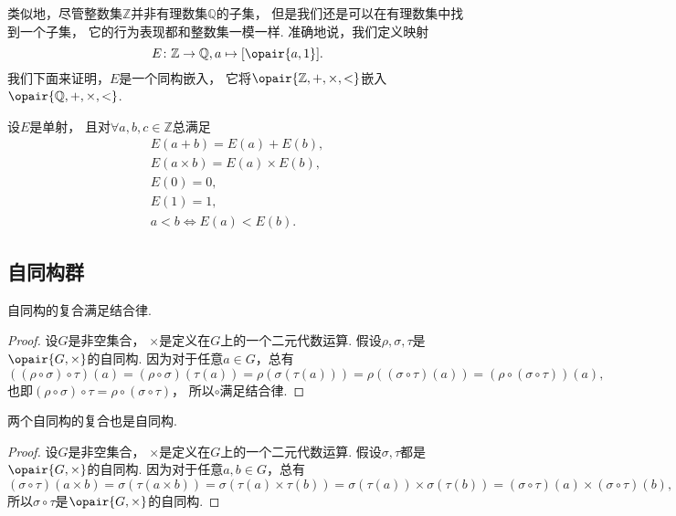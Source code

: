 类似地，尽管整数集\(\mathbb{Z}\)并非有理数集\(\mathbb{Q}\)的子集，
但是我们还是可以在有理数集中找到一个子集，
它的行为表现都和整数集一模一样.
准确地说，我们定义映射\[
	E\colon \mathbb{Z}\to\mathbb{Q}, a\mapsto[\opair{a,1}].
\]
我们下面来证明，\(E\)是一个同构嵌入，
它将\(\opair{\mathbb{Z},+,\times,<}\)嵌入\(\opair{\mathbb{Q},+,\times,<}\).
\begin{theorem}
设\(E\)是单射，
且对\(\forall a,b,c\in\mathbb{Z}\)总满足\begin{gather}
	E(a+b)=E(a)+E(b), \\
	E(a \times b)=E(a) \times E(b), \\
	E(0)=0, \\
	E(1)=1, \\
	a<b \iff E(a)<E(b).
\end{gather}
\end{theorem}

\subsection{自同构群}
\begin{theorem}\label{theorem:抽象代数.自同构的复合满足结合律}
自同构的复合满足结合律.
\begin{proof}
设\(G\)是非空集合，
\(\times\)是定义在\(G\)上的一个二元代数运算.
假设\(\rho,\sigma,\tau\)是\(\opair{G,\times}\)的自同构.
因为对于任意\(a\in G\)，总有\[
	((\rho\circ\sigma)\circ\tau)(a)
	= (\rho\circ\sigma)(\tau(a))
	= \rho(\sigma(\tau(a)))
	= \rho((\sigma\circ\tau)(a))
	= (\rho\circ(\sigma\circ\tau))(a),
\]
也即\((\rho\circ\sigma)\circ\tau=\rho\circ(\sigma\circ\tau)\)，
所以\(\circ\)满足结合律.
\end{proof}
\end{theorem}

\begin{theorem}\label{theorem:抽象代数.两个自同构的复合是自同构}
两个自同构的复合也是自同构.
\begin{proof}
设\(G\)是非空集合，
\(\times\)是定义在\(G\)上的一个二元代数运算.
假设\(\sigma,\tau\)都是\(\opair{G,\times}\)的自同构.
因为对于任意\(a,b\in G\)，总有\[
	(\sigma\circ\tau)(a \times b)
	= \sigma(\tau(a \times b))
	= \sigma(\tau(a)\times\tau(b))
	= \sigma(\tau(a))\times\sigma(\tau(b))
	= (\sigma\circ\tau)(a)\times(\sigma\circ\tau)(b),
\]
所以\(\sigma\circ\tau\)是\(\opair{G,\times}\)的自同构.
\end{proof}
\end{theorem}

